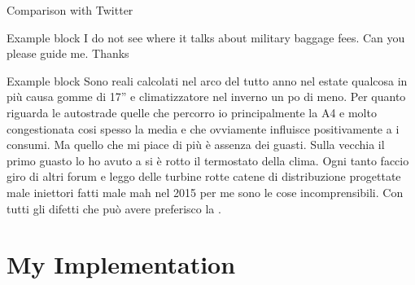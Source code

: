 \documentclass{beamer}
\begin{document}
	\begin{frame}{Comparison with Twitter}
		
		\begin{exampleblock}{Example block}
			 I do not see where it talks about military baggage fees. Can you please guide me. Thanks 
		\end{exampleblock}
	
		\begin{exampleblock}{Example block}
			{\scriptsize
			Sono reali calcolati nel arco del tutto anno nel estate qualcosa in più causa
			gomme di 17” e climatizzatore nel inverno un po di meno. Per quanto
			riguarda le autostrade quelle che percorro io principalmente la A4 e molto
			congestionata cosi spesso la media e  che ovviamente influisce
			positivamente a i consumi. Ma quello che mi piace di più è assenza dei
			guasti. Sulla vecchia  il primo guasto lo ho avuto a  si è
			rotto il termostato della clima. Ogni tanto faccio giro di altri forum e leggo
			delle turbine rotte catene di distribuzione progettate male iniettori fatti male
			mah nel 2015 per me sono le cose incomprensibili. Con tutti gli difetti che
			può avere preferisco la .}
		\end{exampleblock}
	
	\end{frame}





	\section{My Implementation}
\end{document}
